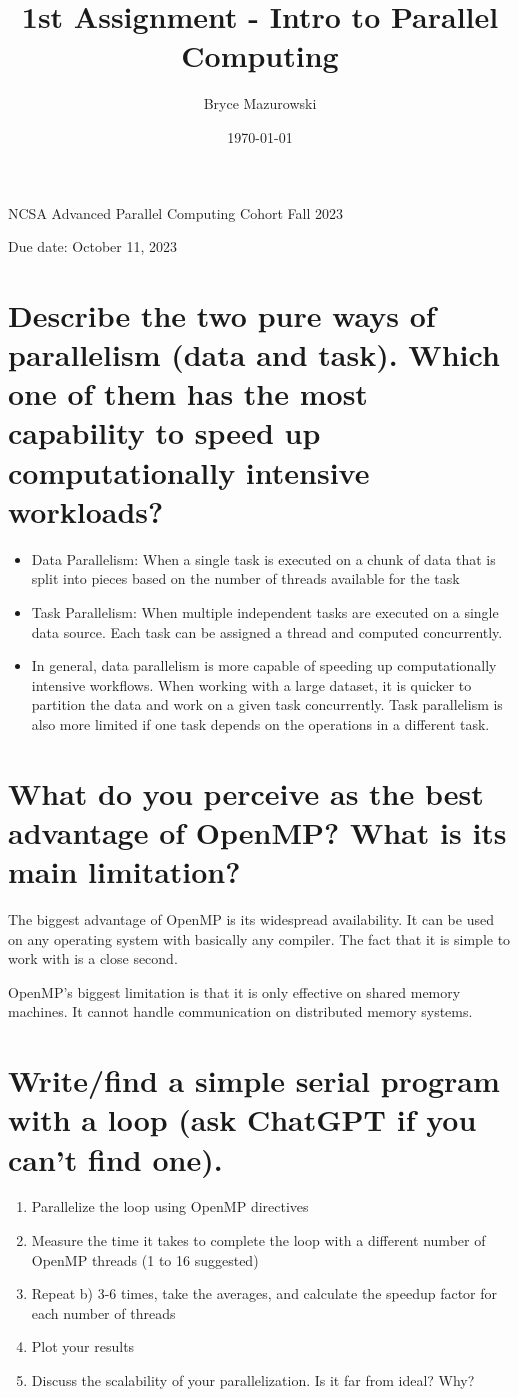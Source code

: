 \documentclass[11pt]{article}
\author{Bryce Mazurowski}
\date{\today}
\title{1st Assignment - Intro to Parallel Computing}
\begin{document}
\maketitle
NCSA Advanced Parallel Computing Cohort
Fall 2023

Due date: October 11, 2023


\section{Describe the two pure ways of parallelism (data and task). Which one of them has the most capability to speed up computationally intensive workloads?}
\label{sec:org6c539b4}
\begin{itemize}
\item Data Parallelism: When a single task is executed on a chunk of data
that is split into pieces based on the number of threads available
for the task
\item Task Parallelism: When multiple independent tasks are executed on a single data
source. Each task can be assigned a thread and computed
concurrently.
\item In general, data parallelism is more capable of speeding up
computationally intensive workflows. When working with a large
dataset, it is quicker to partition the data and work on a given
task concurrently. Task parallelism is also more limited if one task
depends on the operations in a different task.
\end{itemize}

\section{What do you perceive as the best advantage of OpenMP? What is its main limitation?}
\label{sec:org04a770a}
The biggest advantage of OpenMP is its widespread availability. It can
be used on any operating system with basically any compiler. The fact
that it is simple to work with is a close second.

OpenMP's biggest limitation is that it is only effective on shared
memory machines. It cannot handle communication on distributed memory systems.



\section{Write/find a simple serial program with a loop (ask ChatGPT if you can’t find one).}
\label{sec:org76a3c0f}
\begin{enumerate}
\item Parallelize the loop using OpenMP directives
\item Measure the time it takes to complete the loop with a different number of OpenMP threads (1 to 16 suggested)
\item Repeat b) 3-6 times, take the averages, and calculate the speedup factor for each number of threads
\item Plot your results
\item Discuss the scalability of your parallelization. Is it far from ideal? Why?
\end{enumerate}
\end{document}
